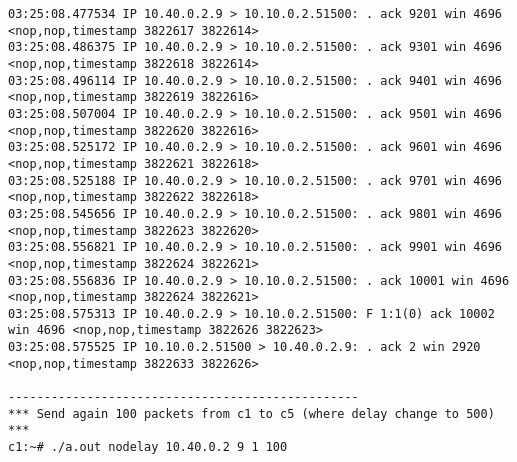 \documentclass[a4paper,12pt]{article}
\begin{document}
\begin{lstlisting}
03:25:08.477534 IP 10.40.0.2.9 > 10.10.0.2.51500: . ack 9201 win 4696 <nop,nop,timestamp 3822617 3822614>
03:25:08.486375 IP 10.40.0.2.9 > 10.10.0.2.51500: . ack 9301 win 4696 <nop,nop,timestamp 3822618 3822614>
03:25:08.496114 IP 10.40.0.2.9 > 10.10.0.2.51500: . ack 9401 win 4696 <nop,nop,timestamp 3822619 3822616>
03:25:08.507004 IP 10.40.0.2.9 > 10.10.0.2.51500: . ack 9501 win 4696 <nop,nop,timestamp 3822620 3822616>
03:25:08.525172 IP 10.40.0.2.9 > 10.10.0.2.51500: . ack 9601 win 4696 <nop,nop,timestamp 3822621 3822618>
03:25:08.525188 IP 10.40.0.2.9 > 10.10.0.2.51500: . ack 9701 win 4696 <nop,nop,timestamp 3822622 3822618>
03:25:08.545656 IP 10.40.0.2.9 > 10.10.0.2.51500: . ack 9801 win 4696 <nop,nop,timestamp 3822623 3822620>
03:25:08.556821 IP 10.40.0.2.9 > 10.10.0.2.51500: . ack 9901 win 4696 <nop,nop,timestamp 3822624 3822621>
03:25:08.556836 IP 10.40.0.2.9 > 10.10.0.2.51500: . ack 10001 win 4696 <nop,nop,timestamp 3822624 3822621>
03:25:08.575313 IP 10.40.0.2.9 > 10.10.0.2.51500: F 1:1(0) ack 10002 win 4696 <nop,nop,timestamp 3822626 3822623>
03:25:08.575525 IP 10.10.0.2.51500 > 10.40.0.2.9: . ack 2 win 2920 <nop,nop,timestamp 3822633 3822626>

-------------------------------------------------
*** Send again 100 packets from c1 to c5 (where delay change to 500) ***
c1:~# ./a.out nodelay 10.40.0.2 9 1 100


\end{lstlisting}
\end{document}
